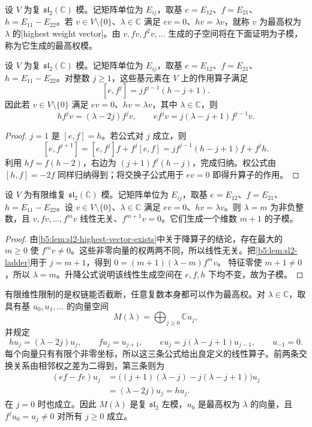 \begin{definition}\label{b5:def:sl2-highest-vector}
	设 \(V\) 为复 \(\mathfrak{sl}_2(\mathbb C)\) 模。记矩阵单位为 \(E_{ij}\)，取基 \(e=E_{12}\)、\(f=E_{21}\)、\(h=E_{11}-E_{22}\)。若 \(v\in V\setminus\{0\}\)、\(\lambda\in\mathbb C\) 满足 \(ev=0\)、\(hv=\lambda v\)，就称 \(v\) 为最高权为 \(\lambda\) 的[highest weight vector]。由 \(v,fv,f^2v,\ldots\) 生成的子空间将在下面证明为子模，称为它生成的最高权模。
\end{definition}
\begin{lemma}\label{b5:lem:sl2-ladder}
	设 \(V\) 为复 \(\mathfrak{sl}_2(\mathbb C)\) 模。记矩阵单位为 \(E_{ij}\)，取基 \(e=E_{12}\)、\(f=E_{21}\)、\(h=E_{11}-E_{22}\)。对整数 \(j\ge1\)，这些基元素在 \(V\) 上的作用算子满足
	\[
		[e,f^j]=j f^{j-1}(h-j+1).
	\]
	因此若 \(v\in V\setminus\{0\}\) 满足 \(ev=0\)、\(hv=\lambda v\)，其中 \(\lambda\in\mathbb C\)，则
	\[
		h f^jv=(\lambda-2j)f^jv,\qquad e f^jv=j(\lambda-j+1)f^{j-1}v.
	\]
\end{lemma}
\begin{proof}
	\(j=1\) 是 \([e,f]=h\)。若公式对 \(j\) 成立，则
	\[
		[e,f^{j+1}]=[e,f^j]f+f^j[e,f] =j f^{j-1}(h-j+1)f+f^jh.
	\]
	利用 \(hf=f(h-2)\)，右边为 \((j+1)f^j(h-j)\)，完成归纳。权公式由 \([h,f]=-2f\) 同样归纳得到；将交换子公式用于 \(ev=0\) 即得升算子的作用。
\end{proof}
\begin{proposition}\label{b5:prop:sl2-finite-string}
	设 \(V\) 为有限维复 \(\mathfrak{sl}_2(\mathbb C)\) 模。记矩阵单位为 \(E_{ij}\)，取基 \(e=E_{12}\)、\(f=E_{21}\)、\(h=E_{11}-E_{22}\)。设 \(v\in V\setminus\{0\}\)、\(\lambda\in\mathbb C\) 满足 \(ev=0\)、\(hv=\lambda v\)。则 \(\lambda=m\) 为非负整数，且 \(v,fv,\ldots,f^mv\) 线性无关、\(f^{m+1}v=0\)。它们生成一个维数 \(m+1\) 的子模。
\end{proposition}
\begin{proof}
	由\cref{b5:lem:sl2-highest-vector-exists}中关于降算子的结论，存在最大的 \(m\ge0\) 使 \(f^mv\ne0\)。这些非零向量的权两两不同，所以线性无关。把\cref{b5:lem:sl2-ladder}用于 \(j=m+1\)，得到 \(0=(m+1)(\lambda-m)f^mv\)。 特征零使 \(m+1\ne0\)，所以 \(\lambda=m\)。升降公式说明该线性生成空间在 \(e,f,h\) 下均不变，故为子模。
\end{proof}

有限维性限制的是权链能否截断，任意复数本身都可以作为最高权。对 \(\lambda\in\mathbb C\)，取具有基 \(u_0,u_1,\ldots\) 的向量空间
\[
	M(\lambda)=\bigoplus_{j\ge0}\mathbb Cu_j,
\]
并规定
\[
	hu_j=(\lambda-2j)u_j,\qquad fu_j=u_{j+1},\qquad eu_j=j(\lambda-j+1)u_{j-1},\qquad u_{-1}=0.
\]
每个向量只有有限个非零坐标，所以这三条公式给出良定义的线性算子。前两条交换关系由相邻权之差为二得到，第三条则为
\[
	\begin{aligned}
		(ef-fe)u_j &=\bigl((j+1)(\lambda-j)-j(\lambda-j+1)\bigr)u_j\\
		&=(\lambda-2j)u_j=hu_j.
	\end{aligned}
\]
在 \(j=0\) 时也成立。因此 \(M(\lambda)\) 是复 \(\mathfrak{sl}_2\) 左模，\(u_0\) 是最高权为 \(\lambda\) 的向量，且 \(f^ju_0=u_j\ne0\) 对所有 \(j\ge0\) 成立。

